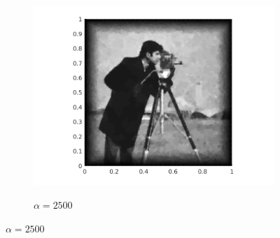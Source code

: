 \begin{figure}[!ht]
\begin{subfigure}{.3\linewidth}
    \caption{$\alpha=2500$}
    \includegraphics[trim = 60 20 60 20, clip, width=\linewidth]
      {pictures/introBeta/snr10/02500.png}
    \label{fig:snr10alpha2500}
  \end{subfigure}


\end{figure}
